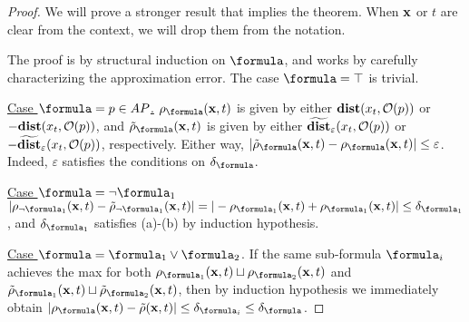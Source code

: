 \begin{proof}
	We will prove a stronger result that implies the theorem.	
	When $\mathbf{x}$ or $t$ are clear from the context, we will drop them from the notation.
	
	The proof is by structural induction on $\formula$, and works by carefully characterizing the approximation error.
	The case $\formula = \top$ is trivial.
	
\underline{Case $\formula = p \in AP$.}
$\robf(\sstraj,t)$ is given by either $\mathbf{dist}(x_t,\mathcal{O}(p))$ or $-\mathbf{dist}(x_t,\mathcal{O}(p))$, and 
$\srobf(\sstraj,t)$ is given by either $\widetilde{\mathbf{dist}}_\varepsilon(x_t,\mathcal{O}(p))$ or $-\widetilde{\mathbf{dist}}_\varepsilon(x_t,\mathcal{O}(p))$, respectively.
Either way, $|\srobf(\sstraj,t) - \robf(\sstraj,t)| \leq \varepsilon$.
Indeed, $\varepsilon$ satisfies the conditions on $\delta_\formula$.

\underline{Case $\formula = \neg \formula_1$} 
$|\rob_{\neg \formula_1}(\sstraj,t)-\srob_{\neg \formula_1}(\sstraj,t)| = |-\rob_{\formula_1}(\sstraj,t) + \rob_{ \formula_1}(\sstraj,t)|  \leq \delta_{\formula_1}$, and $\delta_{\formula_1}$ satisfies (a)-(b) by induction hypothesis.

\underline{Case $\formula = \formula_1 \lor \formula_2$}.
If the same sub-formula $\formula_i$ achieves the max for both $\rob_{\formula_1}(\sstraj,t) \sqcup \rob_{\formula_2}(\sstraj,t)$ and $\srob_{\formula_1}(\sstraj,t) \sqcup \srob_{\formula_2}(\sstraj,t)$, then by induction hypothesis we immediately obtain 
$|\robf(\sstraj,t)-\srob(\sstraj,t)|  \leq \delta_{\formula_i} \leq \delta_{\formula}$.


\end{proof}

